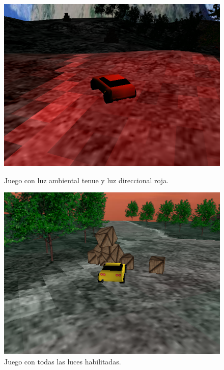 \documentclass[a4paper,10pt]{article}
\begin{document}
\begin{figure}
\begin{minipage}[b]{0.5\linewidth}
\centering
 \includegraphics[scale=0.250]{./sinluz.png}
 \caption{Juego con luz ambiental tenue y luz direccional roja.}
\label{fig:sinluz}
\end{minipage}
\hspace{0.5cm}
\begin{minipage}[b]{0.5\linewidth}
\centering
 \includegraphics[scale=0.250]{./conluz.png}
 \caption{Juego con todas las luces habilitadas.}
\label{fig:conluz}
\end{minipage}
\end{figure}
\end{document}
